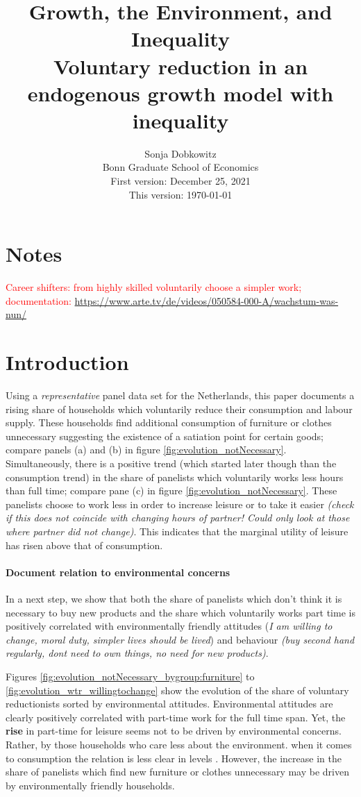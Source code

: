 \documentclass[12pt]{article}
\title{Growth, the Environment, and Inequality\\ \small{ Voluntary reduction in an endogenous growth model with inequality}}
\date{Sonja Dobkowitz\\ Bonn Graduate School of Economics\\ %
	\vspace{1mm}
	First version: December 25, 2021\\
	This version: \today }
\newcommand{\tr}[1]{\textcolor{red}{#1}}
\begin{document}
	\maketitle

\section{Notes}
\tr{Career shifters: from highly skilled voluntarily choose a simpler work; documentation: \url{https://www.arte.tv/de/videos/050584-000-A/wachstum-was-nun/} }	
\section{Introduction}

Using a \textit{representative} panel data set for the Netherlands, this paper documents a rising share of households which voluntarily reduce their consumption and labour supply. These households find additional consumption of furniture or clothes unnecessary suggesting the existence of a satiation point for certain goods; compare panels (a) and (b) in figure \ref{fig:evolution_notNecessary}. Simultaneously, there is a positive trend (which started later though than the consumption trend) in the share of panelists which voluntarily works less hours than full time; compare pane (c) in figure \ref{fig:evolution_notNecessary}. These panelists choose to work less in order to increase leisure or to take it easier \textit{(check if this does not coincide with changing hours of partner! Could only look at those where partner did not change)}. This indicates that the marginal utility of leisure  has risen above that of consumption. 

\paragraph{Document relation to environmental concerns} 
In a next step, we show that both the share of panelists which don't think it is necessary to buy new products and the share which voluntarily works part time is positively correlated with environmentally friendly attitudes (\textit{I am willing to change, moral duty, simpler lives should be lived}) and behaviour \textit{(buy second hand regularly, dont need to own things, no need for new products)}.

Figures \ref{fig:evolution_notNecessary_bygroup:furniture} to \ref{fig:evolution_wtr_willingtochange} show the evolution of the share of voluntary reductionists sorted by environmental attitudes. 
Environmental attitudes are clearly positively correlated with part-time work for the full time span. Yet, the \textbf{rise} in part-time for leisure seems not to be driven by environmental concerns. Rather, by those households who care less about the environment. 
when it comes to consumption the relation is less clear in levels . However, the increase in the share of panelists which find new furniture or clothes unnecessary may be driven by environmentally friendly households. 
\end{document}
